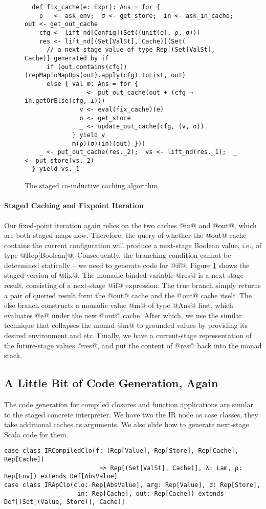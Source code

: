 \begin{figure}[h!]
  \centering
\begin{lstlisting}
  def fix_cache(e: Expr): Ans = for {
    ρ   <- ask_env;  σ <- get_store;  in <- ask_in_cache;  out <- get_out_cache
    cfg <- lift_nd[Config](Set((unit(e), ρ, σ)))
    res <- lift_nd[(Set[ValSt], Cache)](Set(
      // a next-stage value of type Rep[(Set[ValSt], Cache)] generated by if
      if (out.contains(cfg)) (repMapToMapOps(out).apply(cfg).toList, out)
      else { val m: Ans = for {
               _ <- put_out_cache(out + (cfg → in.getOrElse(cfg, ⊥)))
               v <- eval(fix_cache)(e)
               σ <- get_store
               _ <- update_out_cache(cfg, (v, σ))
             } yield v
             m(ρ)(σ)(in)(out) }))
    _ <- put_out_cache(res._2);  vs <- lift_nd(res._1);  _ <- put_store(vs._2)
  } yield vs._1
\end{lstlisting}
\caption{The staged co-inductive caching algorithm.}
\label{fig:staged_coind_cache}
\end{figure}

\paragraph{Staged Caching and Fixpoint Iteration} Our fixed-point iteration
again relies on the two caches @in@ and @out@, which are both staged maps now.
Therefore, the query of whether the @out@ cache contains the current
configuration will produce a next-stage Boolean value, i.e., of type
@Rep[Boolean]@. Consequently, the branching condition cannot be determined
statically -- we need to generate code for @if@. Figure
\ref{fig:staged_coind_cache} shows the staged version of @fix@. The
monadic-binded variable @res@ is a next-stage result, consisting of a next-stage
@if@ expression. The true branch simply returns a pair of queried result form
the @out@ cache and the @out@ cache itself. The else branch constructs a monadic
value @m@ of type @Ans@ first, which evaluates @e@ under the new @out@ cache.
After which, we use the similar technique that collapses the monad @m@ to
grounded values by providing its desired environment and etc. Finally, we have a
current-stage representation of the future-stage values @res@, and put the
content of @res@ back into the monad stack.

\subsection{A Little Bit of Code Generation, Again}
The code generation for compiled closures and function applications are similar
to the staged concrete interpreter. We have two the IR node as case classes, they
take additional caches as arguments. We also elide how to generate next-stage Scala
code for them.
\begin{lstlisting}
case class IRCompiledClo(f: (Rep[Value], Rep[Store], Rep[Cache], Rep[Cache])
                          => Rep[(Set[ValSt], Cache)], λ: Lam, ρ: Rep[Env]) extends Def[AbsValue]
case class IRApClo(clo: Rep[AbsValue], arg: Rep[Value], σ: Rep[Store],
                    in: Rep[Cache], out: Rep[Cache]) extends Def[(Set[(Value, Store)], Cache)]
\end{lstlisting}


